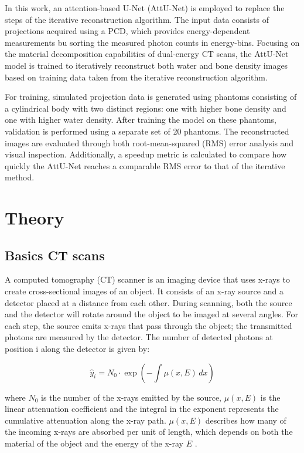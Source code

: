 \documentclass{article}
\begin{document}
In this work, an attention-based U-Net (AttU-Net) is employed to replace the steps of the iterative reconstruction algorithm. The input data consists of projections acquired using a PCD, which provides energy-dependent measurements bu sorting the measured photon counts in energy-bins. Focusing on the material decomposition capabilities of dual-energy CT scans, the AttU-Net model is trained to iteratively reconstruct both water and bone density images based on training data taken from the iterative reconstruction algorithm.

For training, simulated projection data is generated using phantoms consisting of a cylindrical body with two distinct regions: one with higher bone density and one with higher water density. After training the model on these phantoms, validation is performed using a separate set of 20 phantoms. The reconstructed images are evaluated through both root-mean-squared (RMS) error analysis and visual inspection. Additionally, a speedup metric is calculated to compare how quickly the AttU-Net reaches a comparable RMS error to that of the iterative method.

\section{Theory}

\subsection{Basics CT scans}

A computed tomography (CT) scanner is an imaging device that uses x-rays to create cross-sectional images of an object. It consists of an x-ray source and a detector placed at a distance from each other. During scanning, both the source and the detector will rotate around the object to be imaged at several angles. For each step, the source emits x-rays that pass through the object; the transmitted photons are measured by the detector. The number of detected photons at position i along the detector is given by:

\begin{equation}
\label{first }
\hat{y}_i  = N_0 \cdot \exp\left(-\int \mu(x, E) \, dx\right)
\end{equation}

where $N_0$ is the number of the x-rays emitted by the source, $\mu(x, E)$ is the linear attenuation coefficient and the integral in the exponent represents the cumulative attenuation along the x-ray path. $\mu(x, E)$ describes how many of the incoming x-rays are absorbed per unit of length, which depends on both the material of the object and the energy of the x-ray $E$ \citep{kamalian2016ct_principles}.
\end{document}

